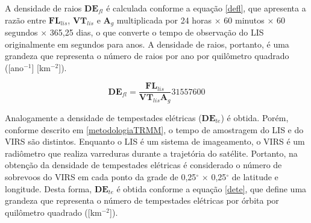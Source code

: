 A densidade de raios $\mathbf{DE}_{fl}$ é calculada conforme a equação \ref{defl}, que apresenta a razão entre $\mathbf{FL}_{lis}$, $\mathbf{VT}_{lis}$ e $\mathbf{A}_g$ multiplicada por 24 horas $\times$ 60 minutos $\times$ 60 segundos $\times$ 365,25 dias, o que converte o tempo de observação do LIS originalmente em segundos para anos. A densidade de raios, portanto, é uma grandeza que representa o número de raios por ano por quilômetro quadrado ([ano$^{-1}$] [km$^{-2}$]).

\begin{equation}
\mathbf{DE}_{fl} = \frac{\mathbf{FL}_{lis}}{\mathbf{VT}_{lis} \mathbf{A}_g} 31557600     
\label{defl}
\end{equation}


Analogamente a densidade de tempestades elétricas ($\mathbf{DE}_{te}$) é obtida. Porém, conforme descrito em \ref{metodologiaTRMM}, o tempo de amostragem do LIS e do VIRS são distintos. Enquanto o LIS é um sistema de imageamento, o VIRS é um radiômetro que realiza varreduras durante a trajetória do satélite. Portanto, na obtenção da densidade de tempestades elétricas é considerado o número de sobrevoos do VIRS em cada ponto da grade de 0,25$^{\circ}$  $\times$ 0,25$^{\circ}$ de latitude e longitude. Desta forma, $\mathbf{DE}_{te}$ é obtida conforme a equação \ref{dete}, que define uma grandeza que representa o número de tempestades elétricas por órbita  por quilômetro quadrado ([km$^{-2}$]).




